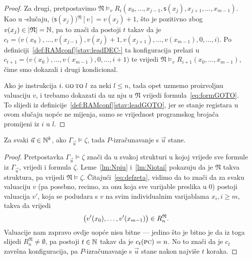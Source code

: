 \begin{proof}
	Za drugi, pretpostavimo $\mathfrak N\models_v R_i(x_0,\dotsc,x_{j-1},\mathsf s(x_j),x_{j+1},\dotsc,x_{m-1})$. Kao u \inc-slučaju, $\bigl(\mathsf s(x_j)\bigr){}^{\mathfrak N}[v]=v(x_j)+1$, što je pozitivno zbog $v(x_j)\in\lvert\mathfrak N\rvert={\mathbb N}$, pa to znači da postoji $t$ takav da je $c_t=\bigl(v(x_0),\dotsc,v(x_{j-1}),v(x_j)+1,v(x_{j+1}),\dotsc,v(x_{m-1}),0,\dotsc,i\bigr)$. Po definiciji~\ref{def:RAMconf}\eqref{stav:leadDEC-} ta konfiguracija prelazi u $c_{t+1}=\bigl(v(x_0),\dotsc,v(x_{m-1}),0,\dotsc,i+1\bigr)$ te vrijedi $\mathfrak N\models_v R_{i+1}(x_0,\dotsc,x_{m-1})$, čime smo dokazali i drugi kondicional.

Ako je instrukcija $i.\;\textsc{go\,to}\;l$ za neki $l\le n$, tada opet uzmemo proizvoljnu valuaciju $v$, i trebamo dokazati da uz nju u $\mathfrak N$ vrijedi formula~\eqref{eq:formGOTO}. To slijedi iz definicije~\ref{def:RAMconf}\eqref{stav:leadGOTO}, jer se stanje registara u ovom slučaju uopće ne mijenja, samo se vrijednost programskog brojača promijeni iz $i$ u $l$.
\end{proof}

\begin{propozicija}[{name=[zaključivanje povlači zaustavljanje]}]\label{pp:models>stop}
Za svaki $\vec u\in{\mathbb N}^k$, ako $\Gamma_{\vec u}\models\zeta$, tada $P$-izračunavanje s $\vec u$ stane.
\end{propozicija}
\begin{proof}
Pretpostavka $\Gamma_{\vec u}\models\zeta$ znači da u svakoj strukturi u kojoj vrijede sve formule iz $\Gamma_{\vec u}$, vrijedi i formula $\zeta$. Leme~\ref{lm:Npiu} i~\ref{lm:Niotai} pokazuju da je $\mathfrak N$ takva struktura, pa vrijedi $\mathfrak N\models\zeta$. Čitajući~\eqref{eq:defzeta}, vidimo da to znači da za svaku valuaciju $v$ (pa posebno, recimo, za onu koja sve varijable preslika u $0$) postoji valuacija $v'$, koja se podudara s $v$ na svim individualnim varijablama $x_i,i\ge m$, takva da vrijedi
\begin{equation}
	\bigl(v'(x_0),\dotsc,v'(x_{m-1})\bigr)\in R_n^{\mathfrak N}\text.
\end{equation}
	Valuacije nam zapravo ovdje uopće nisu bitne --- jedino što je bitno je da iz toga slijedi $R_n^{\mathfrak N}\ne\emptyset$, pa postoji $t\in{\mathbb N}$ takav da je $c_t(\textsc{pc})=n$. No to znači da je $c_t$ završna konfiguracija, pa $P$-izračunavanje s $\vec u$ stane nakon najviše $t$ koraka.
\end{proof}


